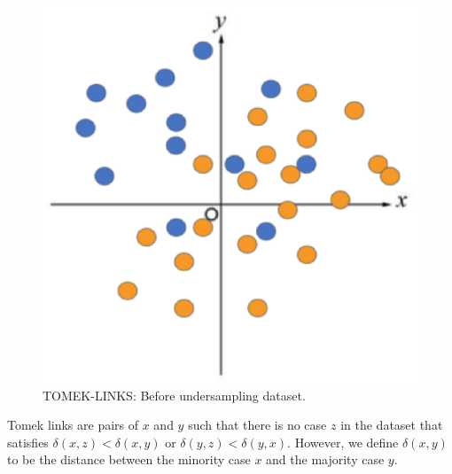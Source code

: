 \begin{center}
    \begin{figure}[ht]
        \caption{TOMEK-LINKS: Before undersampling dataset.}
        \label{tab:team-rating-features}
        \begin{center}
            \includegraphics[scale=0.6]{image/tomek1.eps}
        \end{center}
    \end{figure}
\end{center}

\clearpage

Tomek links are pairs of $x$ and $y$ such that there is no case $z$ in the dataset that satisfies $\delta(x, z) < \delta(x, y)$ or $\delta(y, z) < \delta(y, x)$.
However, we define $\delta(x, y)$ to be the distance between the minority case $x$ and the majority case $y$.

